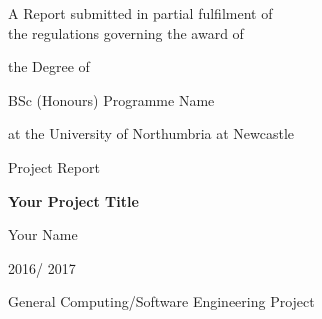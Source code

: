 
\begin{titlepage}
\large
A Report submitted in partial fulfilment of\\
 the regulations governing the award of
\par
the Degree of
\par
{\huge	 BSc (Honours) Programme Name }
\par
at the University of Northumbria at Newcastle
\par
\vspace*{1in}
{Project Report
\par\vspace{1em}
\Huge\bfseries
Your Project Title
}
\vfill
Your Name
\par\vspace{1em}
2016/ 2017
\par\vspace{1em}
General Computing/Software Engineering Project
\end{titlepage}
